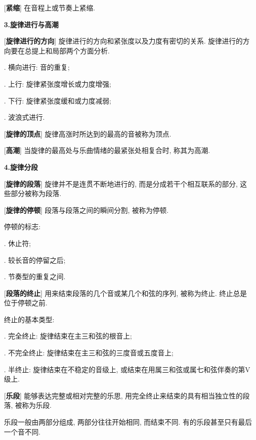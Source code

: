 [\textbf{紧缩}] 在音程上或节奏上紧缩.\par

\begin{center}
 \textbf{3.旋律进行与高潮}\\
\end{center}

[\textbf{旋律进行的方向}] 旋律进行的方向和紧张度以及力度有密切的关系. 旋律进行的方向要在总提上和局部两个方面分析.\par
{}. 横向进行: 音的重复;\par
{}. 上行: 旋律紧张度增长或力度增强;\par
{}. 下行: 旋律紧张度缓和或力度减弱;\par
{}. 波浪式进行.\par

[\textbf{旋律的顶点}] 旋律高涨时所达到的最高的音被称为顶点.

\clearpage

[\textbf{高潮}] 当旋律的最高处与乐曲情绪的最紧张处相复合时, 称其为高潮.\par

\begin{center}
 \textbf{4.旋律分段}\\
\end{center}

[\textbf{旋律的段落}] 旋律并不是连贯不断地进行的, 而是分成若干个相互联系的部分, 这些部分被称为段落.\par

[\textbf{旋律的停顿}] 段落与段落之间的瞬间分割, 被称为停顿.\par
\qquad 停顿的标志:\par
\qquad {}. 休止符;\par
\qquad {}. 较长音的停留之后;\par
\qquad {}. 节奏型的重复之间.\par

[\textbf{段落的终止}] 用来结束段落的几个音或某几个和弦的序列, 被称为终止. 终止总是位于停顿之前.\par
\qquad 终止的基本类型:\par
\qquad {}. 完全终止: 旋律结束在主三和弦的根音上;\par
\qquad {}. 不完全终止: 旋律结束在主三和弦的三度音或五度音上;\par
\qquad {}. 半终止: 旋律结束在不稳定的音级上, 或结束在用属三和弦或属七和弦伴奏的第V级上.\par

[\textbf{乐段}] 能够表达完整或相对完整的乐思, 用完全终止来结束的具有相当独立性的段落, 被称为乐段.\par
\qquad 乐段一般由两部分组成, 两部分往往开始相同, 而结束不同. 有的乐段甚至只有最后一个音不同.\par

